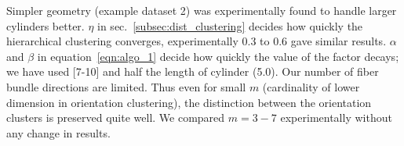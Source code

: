 Simpler geometry (example dataset 2) was experimentally found to handle larger cylinders better. $\eta$ in sec.~\ref{subsec:dist_clustering} decides how quickly the hierarchical clustering converges, experimentally 0.3 to 0.6 gave similar results. 
 $\alpha$ and $\beta$ in equation~\ref{eqn:algo_1} decide how quickly the value of the factor decays; we have used [7-10] and half the length of cylinder (5.0). Our number of fiber bundle directions are limited. Thus even for small $m$ (cardinality of lower dimension in orientation clustering), the distinction between the orientation clusters is preserved quite well. We compared  $m=3-7$ experimentally without any change in results. 
%

 




